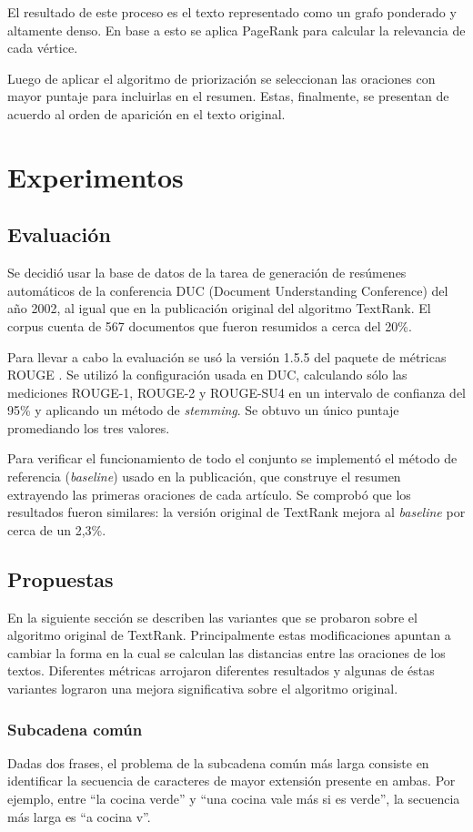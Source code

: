 \documentclass{llncs}
\begin{document}
El resultado de este proceso es el texto representado como un grafo ponderado y altamente denso. En base a esto se aplica PageRank para calcular la relevancia de cada vértice.

Luego de aplicar el algoritmo de priorización se seleccionan las oraciones con mayor puntaje para incluirlas en el resumen. Estas, finalmente, se presentan de acuerdo al orden de aparición en el texto original.


\section{Experimentos}

\subsection{Evaluación}
Se decidió usar la base de datos de la tarea de generación de resúmenes automáticos de la conferencia DUC (Document Understanding Conference) del año 2002, al igual que en la publicación original del algoritmo TextRank. El corpus cuenta de 567 documentos que fueron resumidos a cerca del 20\%.

Para llevar a cabo la evaluación se usó la versión 1.5.5 del paquete de métricas ROUGE \cite{Lin2004a}. Se utilizó la configuración usada en DUC, calculando sólo las mediciones ROUGE-1, ROUGE-2 y ROUGE-SU4 en un intervalo de confianza del 95\% y aplicando un método de \textit{stemming}. Se obtuvo un único puntaje promediando los tres valores.

Para verificar el funcionamiento de todo el conjunto se implementó el método de referencia (\textit{baseline}) usado en la publicación, que construye el resumen extrayendo las primeras oraciones de cada artículo. Se comprobó que los resultados fueron similares: la versión original de TextRank mejora al \textit{baseline} por cerca de un 2,3\%.

\subsection{Propuestas}
En la siguiente sección se describen las variantes que se probaron sobre el algoritmo original de
TextRank. Principalmente estas modificaciones apuntan a cambiar la forma en la cual se calculan las distancias entre las oraciones de los textos. Diferentes métricas arrojaron diferentes resultados y algunas de éstas variantes lograron una mejora significativa sobre el algoritmo original.

\subsubsection{Subcadena común}
Dadas dos frases, el problema de la subcadena común más larga consiste en identificar la secuencia de caracteres de mayor extensión presente en ambas. Por ejemplo, entre “la cocina verde” y “una cocina vale más si es verde”, la secuencia más larga es “a cocina v”.
\end{document}
